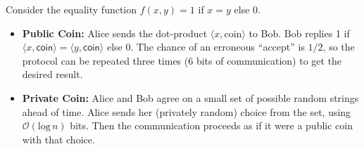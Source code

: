 \begin{example}[=]
Consider the equality function $f(x, y) = 1$ if $x = y$ else 0.
\begin{itemize}
	\item \textbf{Public Coin:} Alice sends the dot-product $\langle x, \text{coin} \rangle$ to Bob.  Bob replies 1 if $\langle x, \textsf{coin} \rangle = \langle y, \textsf{coin} \rangle$ else 0.  The chance of an erroneous ``accept'' is $1/2$, so the protocol can be repeated three times (6 bits of communication) to get the desired result.
	\item \textbf{Private Coin: } Alice and Bob agree on a small set of possible random strings ahead of time.  Alice sends her (privately random) choice from the set, using $\mathcal{O}(\text{log}\, n)$ bits.  Then the communication proceeds as if it were a public coin with that choice.
\end{itemize}
\end{example}